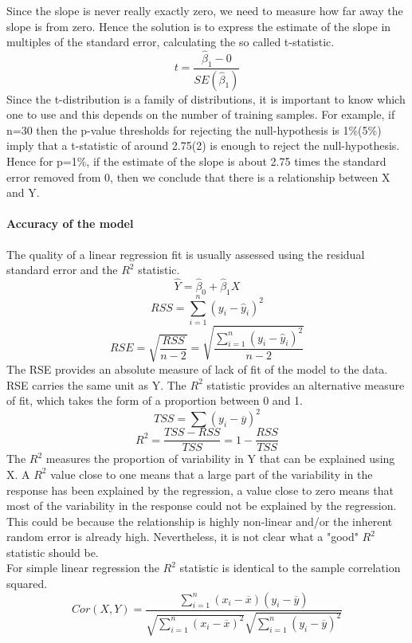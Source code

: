 \documentclass[../document.tex]{subfiles}
\begin{document}
	Since the slope is never really exactly zero, we need to measure how far away the slope is from zero. Hence the solution is to express the estimate of the slope in multiples of the standard error, calculating the so called t-statistic.
	\begin{equation}
		t = \frac{\hat{\beta}_{1}-0}{SE(\hat{\beta}_{1})}
	\end{equation}
	Since the t-distribution is a family of distributions, it is important to know which one to use and this depends on the number of training samples.
	For example, if n=30 then the p-value thresholds for rejecting the null-hypothesis is 1\%(5\%) imply that a t-statistic of around 2.75(2) is enough to reject the null-hypothesis.\\
	Hence for p=1\%, if the estimate of the slope is about 2.75 times the standard error removed from 0, then we conclude that there is a relationship between X and Y.

	\paragraph{Accuracy of the model}
	The quality of a linear regression fit is usually assessed using the residual standard error and the \(R^2\) statistic.
	\begin{equation}
		\hat{Y} = \hat{\beta}_{0} + \hat{\beta}_{1}X
	\end{equation}
	\begin{equation}
		RSS = \sum_{i=1}^{n}(y_{i}-\hat{y}_{i})^2
	\end{equation}
	\begin{equation}
		RSE = \sqrt{\frac{RSS}{n-2}} = \sqrt{\frac{\sum_{i=1}^{n}(y_{i}-\hat{y}_{i})^2}{n-2}}
	\end{equation}
	The RSE provides an absolute measure of lack of fit of the model to the data. RSE carries the same unit as Y. The \(R^2\) statistic provides an alternative measure of fit, which takes the form of a proportion between 0 and 1.
	\begin{equation}
		TSS = \sum(y_{i}-\overline{y})^2
	\end{equation}
	\begin{equation}
		R^2 = \frac{TSS - RSS}{TSS} = 1-\frac{RSS}{TSS}
	\end{equation}
	The \(R^2\) measures the proportion of variability in Y that can be explained using X. A \(R^2\) value close to one means that a large part of the variability in the response has been explained by the regression, a value close to zero means that most of the variability in the response could not be explained by the regression. This could be because the relationship is highly non-linear and/or the inherent random error is already high. Nevertheless, it is not clear what a "good" \(R^2\) statistic should be.\\
	For simple linear regression the \(R^2\) statistic is identical to the sample correlation squared.
	\begin{equation}
		Cor(X,Y)=\frac{\sum_{i=1}^{n}(x_{i}-\overline{x})(y_{i}-\overline{y})}{\sqrt{\sum_{i=1}^{n}(x_{i}-\overline{x})^2}\sqrt{\sum_{i=1}^{n}(y_{i}-\overline{y})^2}}
	\end{equation}
\end{document}
